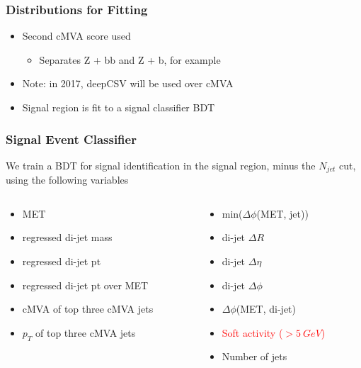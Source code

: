 \documentclass{beamer}
\begin{document}
\begin{frame}
  \frametitle{Distributions for Fitting}
  \begin{itemize}
  \item Second cMVA score used
    \begin{itemize}
    \item Separates Z + bb and Z + b, for example
    \end{itemize}
  \item Note: in 2017, deepCSV will be used over cMVA
  \item Signal region is fit to a signal classifier BDT
  \end{itemize}
\end{frame}

\begin{frame}
  \frametitle{Signal Event Classifier}
  We train a BDT for signal identification in the signal region, minus the $N_{jet}$ cut,
  using the following variables
  \begin{columns}
    \begin{column}{0.5\linewidth}
      \begin{itemize}
      \item MET
      \item regressed di-jet mass
      \item regressed di-jet pt
      \item regressed di-jet pt over MET
      \item cMVA of top three cMVA jets
      \item $p_T$ of top three cMVA jets
      \end{itemize}
    \end{column}
    \begin{column}{0.5\linewidth}
      \begin{itemize}
      \item min($\Delta \phi$(MET, jet))
      \item di-jet $\Delta R$
      \item di-jet $\Delta \eta$
      \item di-jet $\Delta \phi$
      \item $\Delta \phi$(MET, di-jet)
      \item \textcolor{red}{Soft activity ($> \SI{5}{GeV}$)}
      \item Number of jets
      \end{itemize}
    \end{column}
  \end{columns}
\end{frame}
\end{document}
